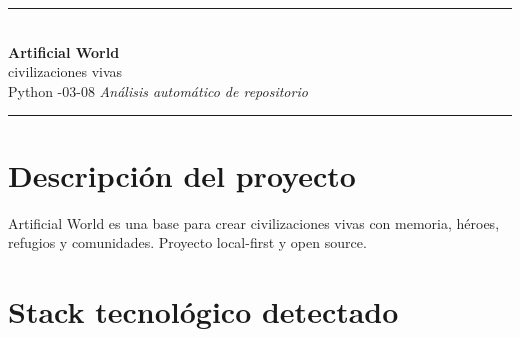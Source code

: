 \documentclass[10pt,a4paper]{article}
\begin{document}

\begin{center}
  {\color{accent}\rule{\linewidth}{2.5pt}}\\[0.6em]
  {\LARGE\bfseries\color{dark} Artificial World}\\[0.3em]
  {\large\color{accent} civilizaciones vivas}\\[0.3em]
  {\small\color{muted}
    Python
    \quad\textperiodcentered{}-03-08
    \quad\textperiodcentered\quad
    \textit{Análisis automático de repositorio}
  }\\[0.5em]
  {\color{accent}\rule{\linewidth}{2.5pt}}
\end{center}

\vspace{0.3em}

\section{Descripción del proyecto}

\noindent\colorbox{accent!8}{\parbox{\dimexpr\linewidth-2\fboxsep\relax}{%
  Artificial World es una base para crear civilizaciones vivas con memoria, héroes, refugios y comunidades. Proyecto local-first y open source.
}}

\vspace{0.5em}

\section{Stack tecnológico detectado}
\end{document}
